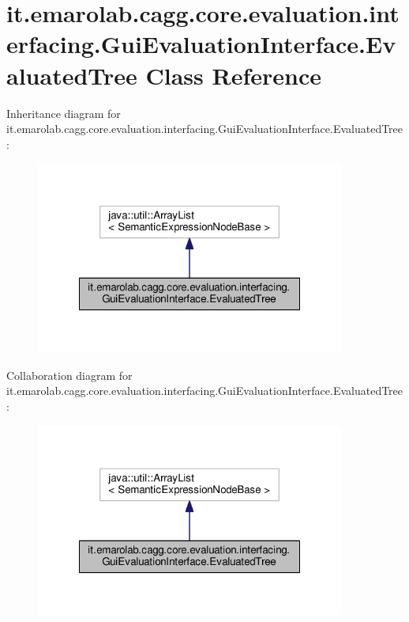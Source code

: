 \hypertarget{classit_1_1emarolab_1_1cagg_1_1core_1_1evaluation_1_1interfacing_1_1GuiEvaluationInterface_1_1EvaluatedTree}{\section{it.\-emarolab.\-cagg.\-core.\-evaluation.\-interfacing.\-Gui\-Evaluation\-Interface.\-Evaluated\-Tree Class Reference}
\label{classit_1_1emarolab_1_1cagg_1_1core_1_1evaluation_1_1interfacing_1_1GuiEvaluationInterface_1_1EvaluatedTree}
}


Inheritance diagram for it.\-emarolab.\-cagg.\-core.\-evaluation.\-interfacing.\-Gui\-Evaluation\-Interface.\-Evaluated\-Tree\-:\nopagebreak
\begin{figure}[H]
\begin{center}
\leavevmode
\includegraphics[width=288pt]{classit_1_1emarolab_1_1cagg_1_1core_1_1evaluation_1_1interfacing_1_1GuiEvaluationInterface_1_1EvaluatedTree__inherit__graph}
\end{center}
\end{figure}


Collaboration diagram for it.\-emarolab.\-cagg.\-core.\-evaluation.\-interfacing.\-Gui\-Evaluation\-Interface.\-Evaluated\-Tree\-:\nopagebreak
\begin{figure}[H]
\begin{center}
\leavevmode
\includegraphics[width=288pt]{classit_1_1emarolab_1_1cagg_1_1core_1_1evaluation_1_1interfacing_1_1GuiEvaluationInterface_1_1EvaluatedTree__coll__graph}
\end{center}
\end{figure}
